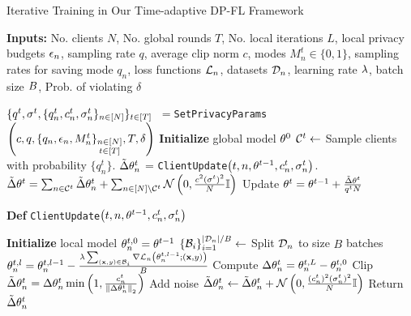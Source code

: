 \begin{minipage}{0.50\textwidth}  %
  \raggedright  %
 \begin{algorithm}[H]
   \scriptsize
\caption{Iterative Training in Our Time-adaptive DP-FL Framework}
\textbf{Inputs:} No. clients $N$, No. global rounds $T$, No. local iterations $L$, local privacy budgets ${\epsilon}_n$, sampling rate $q$, average clip norm $c$, modes $M_n^t \in\{0,1\}$, sampling rates for saving mode $q_n$, loss functions ${\mathcal{L}}_n$, datasets $\mathcal{D}_n$, learning rate $\lambda$, batch size $B$, Prob. of violating $\delta$ \\ 
\label{alg:tidpfl:train}
\begin{algorithmic}[1]
\State $\{q^t, \sigma^t, \{q_n^t, c_n^t, \sigma_n^t\}_{n\in [N]}\}_{t\in [T]}$\ $=$\texttt{SetPrivacyParams}$\left(c, q,  \{q_n, {\epsilon}_n, M_n^t\}_{\substack{n\in [N]\\ t\in [T]}}, T, \delta\right)$
\State \textbf{Initialize} global model ${\theta}^0$
\State ${\mathcal{C}}^t \gets$ Sample clients with probability $\{q_n^t\}$.
\State $\tilde{\Delta}{\theta}_n^t$ =  
\texttt{ClientUpdate}$\left(t, n,{\theta}^{t-1}, c_n^t, \sigma_n^t\right)$.
\EndFor
\State $\tilde{\Delta}{\theta}^t = \sum_{n\in {\mathcal{C}}^t} \tilde{\Delta}{\theta}_n^t +  \sum_{n\in  [N]\backslash {\mathcal{C}}^t} {\mathcal{N}}\left(0,\frac{c^2(\sigma^t)^2}{N}{\mathbb{I}}\right)$
\State Update ${\theta}^{t} = {\theta}^{t-1} + \frac{\tilde{\Delta}{\theta}^t}{q^tN}$
\EndFor
\Statex
\end{algorithmic}
\textbf{Def} \texttt{ClientUpdate}$\left(t, n,{\theta}^{t-1}, c_n^t, \sigma_n^t\right)$
\begin{algorithmic}[1]
\State \textbf{Initialize} local model ${\theta}_n^{t,0}={\theta}^{t-1}$
\State $\{{\mathcal{B}}_i\}_{i=1}^{|\mathcal{D}_n|/B} \gets$ Split $\mathcal{D}_n$ to size $B$ batches
\State ${\theta}_n^{t,l} = {\theta}_n^{t,l-1}-\frac{\lambda \sum_{({\mathbf{x}},y)\in {\mathcal{B}}_i} \nabla{\mathcal{L}}_n\left({\theta}_n^{t,l-1};({\mathbf{x}},y)\right)}{B}$
\EndFor
\EndFor
\State Compute $\Delta{\theta}_n^t = {\theta}_n^{t,L} - {\theta}_n^{t,0}$
\State Clip $\tilde{\Delta}{\theta}_n^{t} = \Delta{\theta}_n^t\min\left(1,\frac{c_n^t}{\left\|\Delta{\theta}_n^{t}\right\|_2}\right)$  
\State Add noise $\tilde{\Delta}{\theta}_n^t \gets \tilde{\Delta}{\theta}_n^t + {\mathcal{N}}\left(0,\frac{(c_n^t)^2(\sigma_n^t)^2}{N}{\mathbb{I}}\right)$
\State Return $\tilde{\Delta}{\theta}_n^{t}$ 
\Statex
\end{algorithmic}
\end{algorithm}
\end{minipage}